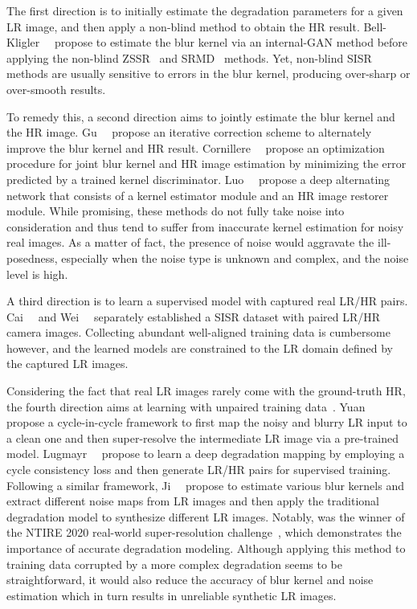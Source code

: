 \documentclass[10pt,twocolumn,letterpaper]{article}
\begin{document}
The first direction is to initially estimate the degradation parameters for a given LR image, and then apply a non-blind method to obtain the HR result. Bell-Kligler~\etal~\cite{bell2019blind} propose to estimate the blur kernel via an internal-GAN method before applying the non-blind ZSSR~\cite{shocher2018zero} and SRMD~\cite{zhang2018learning} methods. Yet, non-blind SISR methods are usually sensitive to errors in the blur kernel, producing over-sharp or over-smooth results.

To remedy this, a second direction aims to jointly estimate the blur kernel and the HR image. Gu~\etal~\cite{gu2019blind} propose an iterative correction scheme to alternately improve the blur kernel and HR result.
Cornillere~\etal~\cite{cornillere2019blind} propose an optimization procedure for joint blur kernel and HR image estimation by minimizing the error predicted by a trained kernel discriminator. Luo~\etal~\cite{luo2020unfolding} propose a deep alternating network that consists of a kernel estimator module and an HR image restorer module.
While promising, these methods do not fully take noise into consideration and thus tend to suffer from inaccurate kernel estimation for noisy real images. As a matter of fact, the presence of noise would aggravate the ill-posedness, especially when the noise type is unknown and complex, and the noise level is high.

A third direction is to learn a supervised model with captured real LR/HR pairs. Cai~\etal~\cite{cai2019toward} and Wei~\etal~\cite{wei2020aim} separately established a SISR dataset with paired LR/HR camera images. Collecting abundant well-aligned training data is cumbersome however, and the learned models are constrained to the LR domain defined by the captured LR images.

Considering the fact that real LR images rarely come with the ground-truth HR, the fourth direction aims at learning with unpaired training data~\cite{wang2021unsupervised}.
Yuan~\etal~\cite{yuan2018unsupervised} propose a cycle-in-cycle framework to first map the noisy and blurry LR input to a clean one and then super-resolve the intermediate LR image via a pre-trained model.
Lugmayr~\etal~\cite{lugmayr2019unsupervised} propose to learn a deep degradation mapping by employing a cycle consistency loss and then generate LR/HR pairs for supervised training.
Following a similar framework, Ji~\etal~\cite{ji2020real} propose to estimate various blur kernels and extract different noise maps from LR images and then apply the traditional degradation model to synthesize different LR images. Notably, \cite{ji2020real} was the winner of the NTIRE 2020 real-world super-resolution challenge~\cite{lugmayr2020ntire}, which demonstrates the importance of accurate degradation modeling. Although applying this method to training data corrupted by a more complex degradation seems to be straightforward, it would also reduce the accuracy of blur kernel and noise estimation which in turn results in unreliable synthetic LR images.
\end{document}
